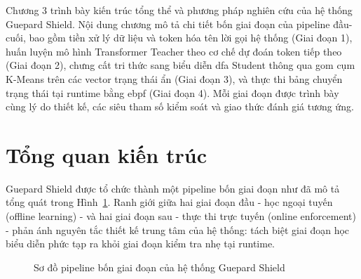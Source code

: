\documentclass[../main.tex]{subfiles}
\begin{document}
Chương 3 trình bày kiến trúc tổng thể và phương pháp nghiên cứu của
hệ thống Guepard
Shield. Nội dung chương mô tả chi tiết bốn giai đoạn của pipeline
đầu-cuối, bao gồm tiền
xử lý dữ liệu và token hóa tên lời gọi hệ thống (Giai đoạn 1), huấn
luyện mô hình
Transformer Teacher theo cơ chế dự đoán token tiếp theo (Giai đoạn
2), chưng cất tri
thức sang biểu diễn \gls{dfa} Student thông qua gom cụm K-Means trên các
vector trạng thái ẩn
(Giai đoạn 3), và thực thi bảng chuyển trạng thái tại runtime bằng
\gls{ebpf} (Giai đoạn 4).
Mỗi giai đoạn được trình bày cùng lý do thiết kế, các siêu tham số
kiểm soát và giao thức
đánh giá tương ứng.

\section{Tổng quan kiến trúc}
\label{sec:method_overview}

Guepard Shield được tổ chức thành một pipeline bốn giai đoạn như đã
mô tả tổng quát trong
Hình~\ref{fig:pipeline}. Ranh giới giữa hai giai đoạn đầu - học ngoại
tuyến (offline
learning) - và hai giai đoạn sau - thực thi trực tuyến (online
enforcement) - phản ánh
nguyên tắc thiết kế trung tâm của hệ thống: tách biệt giai đoạn học
biểu diễn phức tạp
ra khỏi giai đoạn kiểm tra nhẹ tại runtime.

\begin{figure}[H]
  \centering
  \caption{Sơ đồ pipeline bốn giai đoạn của hệ thống Guepard Shield}
  \label{fig:pipeline}
\end{figure}
\end{document}
